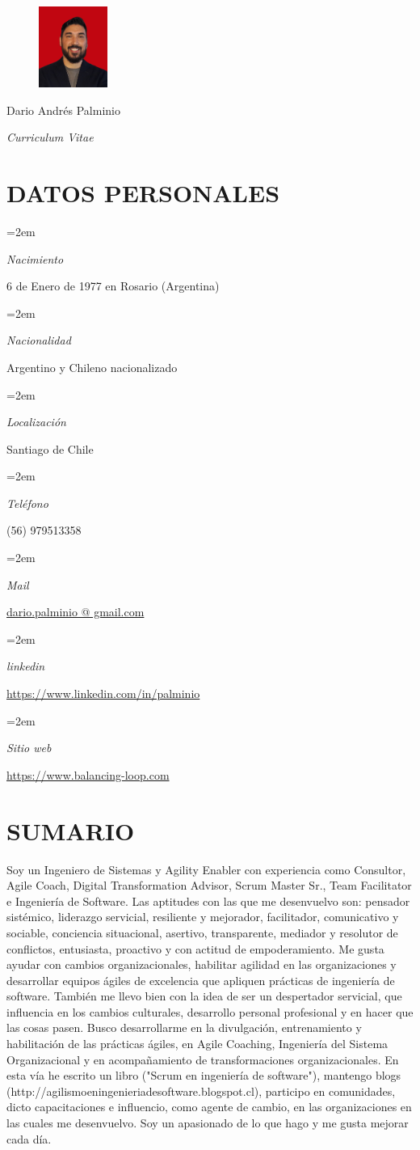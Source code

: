 \documentclass[paper=a4,fontsize=11pt]{scrartcl} %
\newlength{\spacebox}
\newcommand{\sepspace}{\vspace*{1em}}		%
\newcommand{\MyName}[1]{ %
		\Huge \usefont{OT1}{phv}{b}{n} \hfill #1
		\par \normalsize \normalfont}
\newcommand{\MySlogan}[1]{ %
		\large \usefont{OT1}{phv}{m}{n}\hfill \textit{#1}
		\par \normalsize \normalfont}
\newcommand{\NewPart}[1]{\section*{\uppercase{#1}}}
\newcommand{\PersonalEntry}[2]{
		\noindent\hangindent=2em\hangafter=0 %
		\parbox{\spacebox}{        %
		\textit{#1}}		       %
		\hspace{1.5em} #2 \par}    %
\begin{document}

\begin{figure}
	\hfill
	\includegraphics[width=0.2\textwidth]{photo1}
	\vspace{-7cm}
\end{figure}

\MyName{Dario Andrés Palminio}
\MySlogan{Curriculum Vitae}

\sepspace

\NewPart{Datos personales}{}

\PersonalEntry{Nacimiento}{6 de Enero de 1977 en Rosario (Argentina)}
\PersonalEntry{Nacionalidad}{Argentino y Chileno nacionalizado}
\PersonalEntry{Localización}{Santiago de Chile}
\PersonalEntry{Teléfono}{(56) 979513358}
\PersonalEntry{Mail}{\url{dario.palminio  @  gmail.com}}
\PersonalEntry{linkedin}{\url{https://www.linkedin.com/in/palminio}}
\PersonalEntry{Sitio web}{\url{https://www.balancing-loop.com}}

\NewPart{Sumario}{}

Soy un Ingeniero de Sistemas y Agility Enabler con experiencia como Consultor, Agile Coach, Digital Transformation Advisor, Scrum Master Sr., Team Facilitator e Ingeniería de Software. Las aptitudes con las que me desenvuelvo son: pensador sistémico, liderazgo servicial, resiliente y mejorador, facilitador, comunicativo y sociable, conciencia situacional, asertivo, transparente, mediador y resolutor de conflictos, entusiasta, proactivo y con actitud de empoderamiento.
Me gusta ayudar con cambios organizacionales, habilitar agilidad en las organizaciones y desarrollar equipos ágiles de excelencia que apliquen prácticas de ingeniería de software. También me llevo bien con la idea de ser un despertador servicial, que influencia en los cambios culturales, desarrollo personal profesional y en hacer que las cosas pasen. Busco desarrollarme en la divulgación, entrenamiento y habilitación de las prácticas ágiles, en Agile Coaching, Ingeniería del Sistema Organizacional y en acompañamiento de transformaciones organizacionales. En esta vía he escrito un libro ("Scrum en ingeniería de software"), mantengo blogs (http://agilismoeningenieriadesoftware.blogspot.cl), participo en comunidades, dicto capacitaciones e influencio, como agente de cambio, en las organizaciones en las cuales me desenvuelvo. Soy un apasionado de lo que hago y me gusta mejorar cada día.
\end{document}
